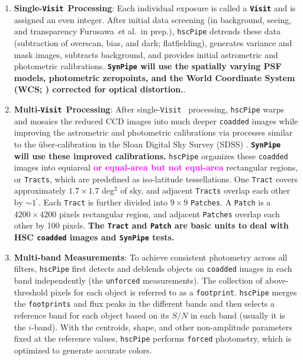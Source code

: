 \documentclass[useamsfonts]{pasj01}
\def\amin{$^\prime$}
\def\etal{{\ et al.~}}
\def\hscpipe{\texttt{hscPipe}}
\def\synpipe{\texttt{SynPipe}}
\def\forced{\texttt{forced}}
\def\unforced{\texttt{unforced}}
\def\tract{\texttt{Tract}}
\def\tracts{\texttt{Tracts}}
\newcommand{\term}[1]{\textbf{\texttt{#1}}}
\newcommand{\susan}[1]{\textcolor{magenta} {\textbf{#1}}}
\begin{document}
    \begin{enumerate}

        \item \textbf{Single-\texttt{Visit~}Processing}:
            Each individual exposure is called a \term{Visit} and is assigned 
            an even integer.
            After initial data screening (in background, seeing, and transparency
            Furusawa\etal in prep.), \hscpipe{} detrends these data (subtraction
            of overscan, bias, and dark; flatfielding), generates variance and mask
            images, subtracts background, and provides initial astrometric and
            photometric calibrations.
            \textbf{\synpipe{} will use the spatially varying PSF models, photometric zeropoints, and the
            World Coordinate System (WCS; \citealt{WCS1, WCS2}) corrected for optical
            distortion.}.

        \item \textbf{Multi-\texttt{Visit~}Processing}:
            After single-\texttt{Visit~} processing, \hscpipe{}  warps and mosaics the reduced CCD images into
            much deeper \texttt{coadded} images while improving the astrometric and
            photometric calibrations via processes similar to the \"{u}ber-calibration
            in the Sloan Digital Sky Survey (SDSS) \citep{Padmanabhan2008}.
            \textbf{\synpipe{} will use these improved calibrations.}
            \hscpipe{} organizes these \texttt{coadded} images into equiareal \susan{or equal-area but not equi-area}
            rectangular regions, or \tracts{}, which are predefined as iso-latitude tessellations.
            One \tract{} covers approximately $1.7\times 1.7$ deg$^2$ of
            sky, and adjacent \tracts{} overlap each other by ${\sim}1$\amin{}.
            Each \tract{} is further divided into $9\times9$ \texttt{Patches}.
            A \texttt{Patch} is a $4200\times4200$ pixels rectangular region, and
            adjacent \texttt{Patches} overlap each other by 100 pixels.
            \textbf{The \tract{} and \texttt{Patch} are basic units to deal
            with HSC \texttt{coadded} images and \synpipe{} tests.}

        \item \textbf{Multi-band Measurements}:
            To achieve consistent photometry across all filters, \hscpipe{} first
            detects and deblends objects on \texttt{coadded} images in each band
            independently (the \unforced{} measurements).
            The collection of above-threshold pixels for each object is referred to as
          a  \texttt{footprint}.
           \hscpipe{} merges the \texttt{footprints} and flux peaks in the different
            bands and then selects a reference band for each object based on its $S/N$ in
            each band (usually it is the $i$-band).
            With the centroids, shape, and other non-amplitude parameters fixed at the
            reference values, \hscpipe{} performs \forced{} photometry, which is
            optimized to generate accurate colors.


\end{enumerate}
\end{document}
